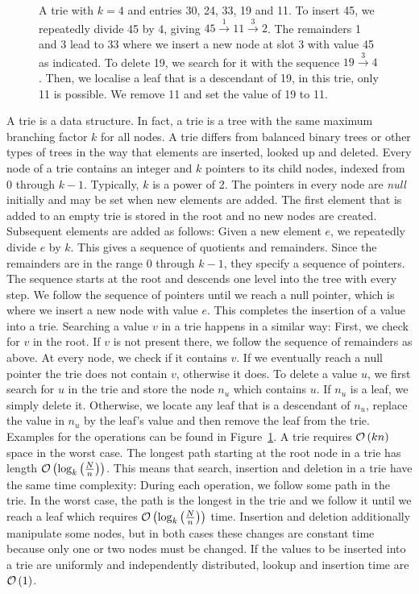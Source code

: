 \begin{figure}
	\centering
	
	\caption{ \small A trie with $k = 4$ and entries 30, 24, 33, 19 and 11.
		To insert 45, we repeatedly divide 45 by 4, giving
			$45 \overset{1}{\longrightarrow} 11  \overset{3}{\longrightarrow} 2$.
		The remainders 1 and 3 lead to 33 where we insert a new node at slot 3 with value 45 as indicated.
		To delete 19, we search for it with the sequence $19 \overset{3}{\longrightarrow} 4$.
		Then, we localise a leaf that is a descendant of 19, in this trie, only 11 is possible.
		We remove 11 and set the value of 19 to 11.
		\label{fig:trie}}
\end{figure}


A trie \cite{knuth:tries} is a data structure.
In fact, a trie is a tree with the same maximum branching factor $k$ for all nodes.
A trie differs from balanced binary trees or other types of trees in the way that elements are inserted, looked up and deleted.
Every node of a trie contains an integer and $k$ pointers to its child nodes, indexed from 0 through $k - 1$.
Typically, $k$ is a power of 2.
The pointers in every node are \emph{null} initially and may be set when new elements are added.
The first element that is added to an empty trie is stored in the root and no new nodes are created.
Subsequent elements are added as follows:
Given a new element $e$, we repeatedly divide $e$ by $k$.
This gives a sequence of quotients and remainders.
Since the remainders are in the range 0 through $k - 1$, they specify a sequence of pointers.
The sequence starts at the root and descends one level into the tree with every step.
We follow the sequence of pointers until we reach a null pointer, which is where we insert a new node with value $e$.
This completes the insertion of a value into a trie.
Searching a value $v$ in a trie happens in a similar way:
First, we check for $v$ in the root.
If $v$ is not present there, we follow the sequence of remainders as above.
At every node, we check if it contains $v$.
If we eventually reach a null pointer the trie does not contain $v$, otherwise it does.
To delete a value $u$, we first search for $u$ in the trie and store the node $n_u$ which contains $u$.
If $n_u$ is a leaf, we simply delete it.
Otherwise, we locate any leaf that is a descendant of $n_u$, replace the value in $n_u$ by the leaf's value and then remove the leaf from the trie.
Examples for the operations can be found in Figure~\ref{fig:trie}.
A trie requires $\mathcal{O}\left(kn\right)$ space in the worst case.
The longest path starting at the root node in a trie has length $\mathcal{O}\left(\log_k\left( \frac{N}{n} \right)\right)$.
This means that search, insertion and deletion in a trie have the same time complexity:
During each operation, we follow some path in the trie.
In the worst case, the path is the longest in the trie and we follow it until we reach a leaf which requires $\mathcal{O}\left(\log_k\left( \frac{N}{n} \right)\right)$ time.
Insertion and deletion additionally manipulate some nodes, but in both cases these changes are constant time because only one or two nodes must be changed.
If the values to be inserted into a trie are uniformly and independently distributed, lookup and insertion time are $\mathcal{O}\left(1\right)$.
